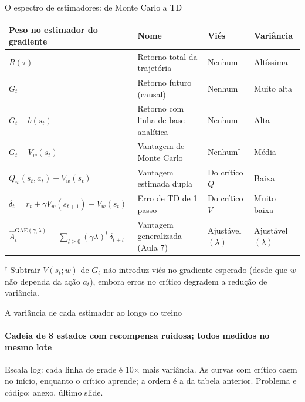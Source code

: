 \documentclass[aspectratio=169, 11pt]{beamer}
\newcommand{\Ahat}{\hat{A}}
\begin{document}
\begin{frame}{O espectro de estimadores: de Monte Carlo a TD}
  \footnotesize\setlength{\tabcolsep}{4pt}
  \begin{tabular}{@{}llll@{}}
    \toprule
    \textbf{Peso no estimador do gradiente} & \textbf{Nome} & \textbf{Viés} & \textbf{Variância} \\
    \midrule
    $R(\tau)$ & Retorno total da trajetória & Nenhum & Altíssima \\
    $G_t$ & Retorno futuro (causal) & Nenhum & Muito alta \\
    $G_t - b(s_t)$ & Retorno com linha de base analítica & Nenhum & Alta \\
    $G_t - V_w(s_t)$ & Vantagem de Monte Carlo & Nenhum$^\dagger$ & Média \\
    $Q_w(s_t,a_t) - V_w(s_t)$ & Vantagem estimada dupla & Do crítico $Q$ & Baixa \\
    $\delta_t = r_t + \gamma V_w(s_{t+1}) - V_w(s_t)$ & Erro de TD de 1 passo & Do crítico $V$ & Muito baixa \\
    \rowcolor{rlAzulClaro!8}
    $\Ahat_t^{\mathrm{GAE}(\gamma,\lambda)} = \sum_{l\ge0}(\gamma\lambda)^l\,\delta_{t+l}$ & Vantagem generalizada (Aula 7) & Ajustável $(\lambda)$ & Ajustável $(\lambda)$ \\
    \bottomrule
  \end{tabular}

  \vspace{0.8em}
  {\footnotesize $^\dagger$ Subtrair $V(s_t;w)$ de $G_t$ não introduz viés no gradiente esperado (desde que
  $w$ não dependa da ação $a_t$), embora erros no crítico degradem a redução de variância.}
\end{frame}

\begin{frame}{A variância de cada estimador ao longo do treino}
  \framesubtitle{Cadeia de 8 estados com recompensa ruidosa; todos medidos no mesmo lote}

  \begin{center}
    
  \end{center}
  \vspace{-0.6em}
  {\small Escala log: cada linha de grade é 10$\times$ mais variância. As curvas com crítico caem
  no início, enquanto o crítico aprende; a ordem é a da tabela anterior.}
  {\scriptsize\color{rlCinza} Problema e código: anexo, último slide.}
\end{frame}
\end{document}
